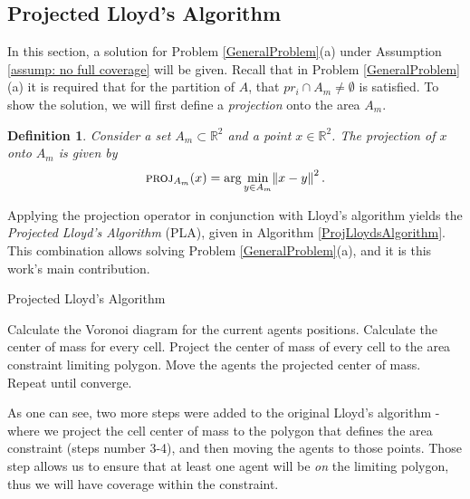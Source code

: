 \documentclass{iacas}
\newtheorem{definition}{Definition}
\begin{document}
\subsection{Projected Lloyd's Algorithm}
In this section, a solution for Problem \ref{GeneralProblem}(a) under Assumption \ref{assump: no full coverage} will be given. Recall that in Problem \ref{GeneralProblem}(a) it is required that for the partition of $A$, that $pr_i \cap A_m \neq \emptyset$ is satisfied.
%
To show the solution, we will first define a \emph{projection} onto the area $A_m$.
\begin{definition}
Consider a set $A_m \subset \mathbb{R}^2$ and a point $x \in \mathbb{R}^2$.  The \emph{projection} of $x$ onto $A_m$ is given by
$$\textsc{proj}_{A_m}(x) = \arg\min_{y \in A_m} \norm{x-y}^2.$$
\label{def:projection operator}
\end{definition}

Applying the projection operator in conjunction with Lloyd's algorithm yields the \emph{Projected Lloyd's Algorithm} (PLA), given in Algorithm \ref{ProjLloydsAlgorithm}. This combination allows solving Problem \ref{GeneralProblem}(a), and it is this work's main contribution.%
\begin{algorithm}
\caption{Projected Lloyd's Algorithm}\label{ProjLloydsAlgorithm}
\begin{algorithmic}[1]
\State Calculate the Voronoi diagram for the current agents positions.
\State Calculate the center of mass for every cell.
\State Project the center of mass of every cell to the area constraint limiting polygon.
\State Move the agents the projected center of mass.
\State Repeat until converge.
\end{algorithmic}
\label{algo:PLA}
\end{algorithm}

As one can see, two more steps were added to the original Lloyd's algorithm - where we project the cell center of mass to the polygon that defines the area constraint (steps number 3-4), and then moving the agents to those points. Those step allows us to ensure that at least one agent will be \emph{on} the limiting polygon, thus we will have coverage within the constraint.
\end{document}
